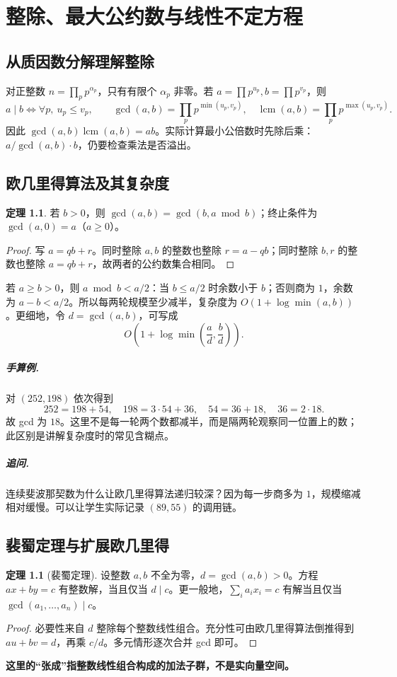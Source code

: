 \documentclass[UTF8,a4paper,11pt,oneside,openany,fontset=fandol]{ctexbook}
\theoremstyle{definition}
\newtheorem{theorem}[definition]{定理}
\newcommand{\lcm}{\operatorname{lcm}}
\begin{document}
\tableofcontents
\mainmatter


\chapter{整除、最大公约数与线性不定方程}
\section{从质因数分解理解整除}
对正整数 $n=\prod_p p^{\alpha_p}$，只有有限个 $\alpha_p$ 非零。若 $a=\prod p^{u_p},b=\prod p^{v_p}$，则
\[
 a\mid b\iff\forall p,\ u_p\le v_p,\qquad
 \gcd(a,b)=\prod_p p^{\min(u_p,v_p)},\quad
 \lcm(a,b)=\prod_p p^{\max(u_p,v_p)}.
\]
因此 $\gcd(a,b)\lcm(a,b)=ab$。实际计算最小公倍数时先除后乘：$a/\gcd(a,b)\cdot b$，仍要检查乘法是否溢出。

\section{欧几里得算法及其复杂度}
\begin{theorem}
若 $b>0$，则 $\gcd(a,b)=\gcd(b,a\bmod b)$；终止条件为 $\gcd(a,0)=a$（$a\ge0$）。
\end{theorem}
\begin{proof}
写 $a=qb+r$。同时整除 $a,b$ 的整数也整除 $r=a-qb$；同时整除 $b,r$ 的整数也整除 $a=qb+r$，故两者的公约数集合相同。
\end{proof}
若 $a\ge b>0$，则 $a\bmod b<a/2$：当 $b\le a/2$ 时余数小于 $b$；否则商为 $1$，余数为 $a-b<a/2$。所以每两轮规模至少减半，复杂度为 $O(1+\log\min(a,b))$。更细地，令 $d=\gcd(a,b)$，可写成
\[
 O\!\left(1+\log\min\left(\frac ad,\frac bd\right)\right).
\]


\paragraph{手算例.} 对 $(252,198)$ 依次得到
\[
252=198+54,\quad198=3\cdot54+36,\quad54=36+18,\quad36=2\cdot18.
\]
故 gcd 为 $18$。这里不是每一轮两个数都减半，而是隔两轮观察同一位置上的数；此区别是讲解复杂度时的常见含糊点。
\paragraph{追问.} 连续斐波那契数为什么让欧几里得算法递归较深？因为每一步商多为 $1$，规模缩减相对缓慢。可以让学生实际记录 $(89,55)$ 的调用链。


\section{裴蜀定理与扩展欧几里得}
\begin{theorem}[裴蜀定理]
设整数 $a,b$ 不全为零，$d=\gcd(a,b)>0$。方程 $ax+by=c$ 有整数解，当且仅当 $d\mid c$。更一般地，$\sum_i a_ix_i=c$ 有解当且仅当 $\gcd(a_1,\ldots,a_n)\mid c$。
\end{theorem}
\begin{proof}
必要性来自 $d$ 整除每个整数线性组合。充分性可由欧几里得算法倒推得到 $au+bv=d$，再乘 $c/d$。多元情形逐次合并 gcd 即可。
\end{proof}
\textbf{这里的“张成”指整数线性组合构成的加法子群，不是实向量空间。}
\end{document}
